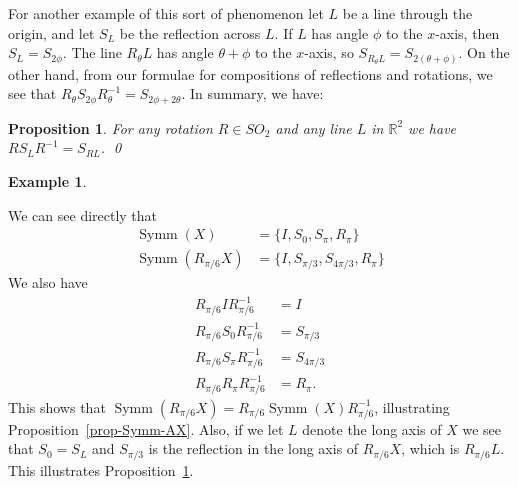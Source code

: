 \documentclass{amsart}
\DeclareMathOperator{\Symm}     {Symm}
\newcommand{\R}         {{\mathbb{R}}}
\renewcommand{\:}{\colon}
\newtheorem{proposition}[theorem]{Proposition}
\theoremstyle{definition}
\newtheorem{example}[theorem]{Example}
\begin{document}
For another example of this sort of phenomenon let $L$ be a line
through the origin, and let $S_L$ be the reflection across $L$.  If
$L$ has angle $\phi$ to the $x$-axis, then $S_L=S_{2\phi}$.  The line
$R_\theta L$ has angle $\theta+\phi$ to the $x$-axis, so
$S_{R_\theta L}=S_{2(\theta+\phi)}$.  On the other hand, from our formulae
for compositions of reflections and rotations, we see that
$R_{\theta}S_{2\phi}R_\theta^{-1}=S_{2\phi+2\theta}$.  In summary, we have:
\begin{proposition}\label{prop-ref-conj}
 For any rotation $R\in SO_2$ and any line $L$ in $\R^2$ we have
 $RS_LR^{-1}=S_{RL}$. \qed
\end{proposition}

\begin{example}
 \begin{center}
 \end{center}
 We can see directly that
 \begin{align*}
  \Symm(X)          &= \{I,S_0,S_\pi,R_\pi\}            \\
  \Symm(R_{\pi/6}X) &= \{I,S_{\pi/3},S_{4\pi/3},R_\pi\}
 \end{align*}
 We also have
 \begin{align*}
  R_{\pi/6} I     R_{\pi/6}^{-1} &= I \\
  R_{\pi/6} S_0   R_{\pi/6}^{-1} &= S_{\pi/3} \\
  R_{\pi/6} S_\pi R_{\pi/6}^{-1} &= S_{4\pi/3} \\
  R_{\pi/6} R_\pi R_{\pi/6}^{-1} &= R_\pi.
 \end{align*}
 This shows that $\Symm(R_{\pi/6}X)=R_{\pi/6}\Symm(X)R_{\pi/6}^{-1}$,
 illustrating Proposition~\ref{prop-Symm-AX}.  Also, if we let $L$
 denote the long axis of $X$ we see that $S_0=S_L$ and $S_{\pi/3}$ is
 the reflection in the long axis of $R_{\pi/6}X$, which is
 $R_{\pi/6}L$.  This illustrates Proposition~\ref{prop-ref-conj}.
\end{example}
\end{document}
